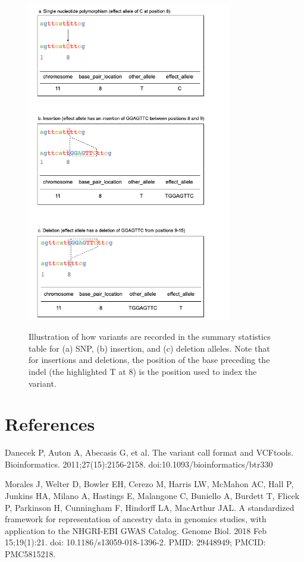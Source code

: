 \documentclass[11pt]{article}
\begin{document}
\begin{figure}[h]
 \centering
 \caption{Illustration of how variants are recorded in the summary statistics table for (a) SNP, (b) insertion, and (c) deletion alleles. Note that for insertions and deletions, the position of the base preceding the indel (the highlighted T at 8) is the position used to index the variant.}
 \includegraphics[width=0.8\textwidth]{variant_rep}
 \label{fig2:variant_rep}
\end{figure}


\section{References}
Danecek P, Auton A, Abecasis G, et al. The variant call format and VCFtools. Bioinformatics. 2011;27(15):2156-2158. doi:10.1093/bioinformatics/btr330

Morales J, Welter D, Bowler EH, Cerezo M, Harris LW, McMahon AC, Hall P, Junkins HA, Milano A, Hastings E, Malangone C, Buniello A, Burdett T, Flicek P, Parkinson H, Cunningham F, Hindorff LA, MacArthur JAL. A standardized framework for representation of ancestry data in genomics studies, with application to the NHGRI-EBI GWAS Catalog. Genome Biol. 2018 Feb 15;19(1):21. doi: 10.1186/s13059-018-1396-2. PMID: 29448949; PMCID: PMC5815218.
\end{document}

